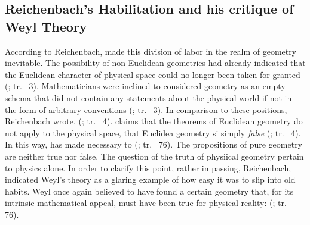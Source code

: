 \documentclass[draft]{article}
\newcommand{\WT}{Weyl's theory\xspace}
\newcommand{\rhp}[2]{(\cite[#1]{Reichenbach1920a}; tr.\ \citeyear{Reichenbach1969} #2)\xspace}
\begin{document}





\subsection{Reichenbach's Habilitation and his critique of Weyl Theory}

According to Reichenbach, \rt made this division of labor in the realm of geometry inevitable. The possibility of non-Euclidean geometries had already indicated that the  Euclidean character of physical space could no longer been taken for granted \rhp{3}{3}. Mathematicians were inclined to considered geometry as an empty schema that did not contain any statements about the physical world if not in the form of arbitrary conventions \rhp{3}{3}. In comparison to these positions, Reichenbach wrote,  \rhp{3}{4}. \Rt claims that the theorems of Euclidean geometry do not apply to the physical space, that Euclidea geometry si simply \emph{false} \rhp{3}{4}. In this way, \rt has made necessary to  \rhp{73}{76}. The propositions of pure geometry are neither true nor false. The question of the truth of physiical geometry pertain to physics alone. In order to clarify this point, rather in passing, Reichenbach, indicated \WT as a glaring example of how easy it was to slip into old habits. Weyl once again believed to have found a certain geometry that, for its intrinsic mathematical appeal, must have been true for physical reality:  \rhp{73}{76}.
\end{document}
